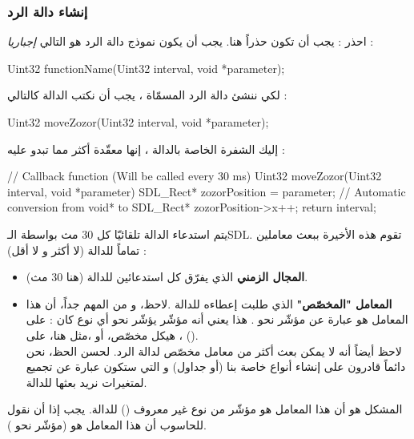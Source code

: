 \subsubsection{إنشاء دالة الرد}

احذر : يجب أن تكون حذراً هنا. يجب أن يكون نموذج دالة الرد هو التالي 
\textit{إجباريا} :

\begin{Csource}
Uint32 functionName(Uint32 interval, void *parameter);
\end{Csource}

لكي ننشئ دالة الرد المسمّاة
،
يجب أن نكتب الدالة كالتالي :

\begin{Csource}
Uint32 moveZozor(Uint32 interval, void *parameter);
\end{Csource}

إليك الشفرة الخاصة بالدالة
،
إنها معقّدة أكثر مما تبدو عليه :

\begin{Csource}
// Callback function (Will be called every 30 ms)
Uint32 moveZozor(Uint32 interval, void *parameter)
{
	SDL_Rect* zozorPosition = parameter; // Automatic conversion from void* to SDL_Rect*
	zozorPosition->x++;
	return interval;
}
\end{Csource}

 يتم استدعاء الدالة 
تلقائيّا كل 30 مث بواسطة الـ\textenglish{SDL}.
تقوم هذه الأخيرة ببعث معاملين تماماً للدالة (لا أكثر و لا أقل) :

\begin{itemize}
	\item \textbf{المجال الزمني}
	الذي يفرّق كل استدعائين للدالة (هنا 30 مث).
	\item \textbf{المعامل "المخصّص"}
	الذي طلبت إعطاءه للدالة .لاحظ، و من المهم جداً، أن هذا المعامل هو عبارة عن مؤشّر نحو
	.
	هذا يعني أنه مؤشّر يؤشّر نحو أي نوع كان : على
	،
	هيكل مخصّص، أو ،مثل هنا، على
	 ().\\
لاحظ أيضاً أنه لا يمكن بعث أكثر من معامل مخصّص لدالة الرد. لحسن الحظ، نحن دائماً قادرون على إنشاء أنواع خاصة بنا (أو جداول) و التي ستكون عبارة عن تجميع لمتغيرات نريد بعثها للدالة.
\end{itemize}

المشكل هو أن هذا المعامل هو مؤشّر من نوع غير معروف
()
للدالة. يجب إذا أن نقول للحاسوب أن هذا المعامل هو
(مؤشّر نحو
).

